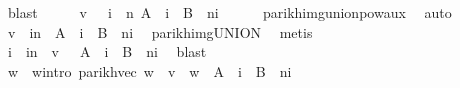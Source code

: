 \begin{isabellebody}
\ blast\isanewline
\ \ \isamarkupfalse%
\ \isamarkupfalse%
\ {\isachardoublequoteopen}v\ {\isasymin}\ {\isasymPsi}\ {\isacharparenleft}{\kern0pt}{\isasymUnion}i\ {\isasymle}\ n{\isachardot}{\kern0pt}\ A\ {\isacharcircum}{\kern0pt}{\isacharcircum}{\kern0pt}\ i\ {\isacharat}{\kern0pt}{\isacharat}{\kern0pt}\ B\ {\isacharcircum}{\kern0pt}{\isacharcircum}{\kern0pt}\ {\isacharparenleft}{\kern0pt}n{\isacharminus}{\kern0pt}i{\isacharparenright}{\kern0pt}{\isacharparenright}{\kern0pt}{\isachardoublequoteclose}\isanewline
\ \ \ \ \isamarkupfalse%
\ parikh{\isacharunderscore}{\kern0pt}img{\isacharunderscore}{\kern0pt}union{\isacharunderscore}{\kern0pt}pow{\isacharunderscore}{\kern0pt}aux{}\ \isamarkupfalse%
\ auto\isanewline
\ \ \isamarkupfalse%
\ \isamarkupfalse%
\ {\isachardoublequoteopen}v\ {\isasymin}\ {\isacharparenleft}{\kern0pt}{\isasymUnion}i{\isasymle}n{\isachardot}{\kern0pt}\ {\isasymPsi}\ {\isacharparenleft}{\kern0pt}A\ {\isacharcircum}{\kern0pt}{\isacharcircum}{\kern0pt}\ i\ {\isacharat}{\kern0pt}{\isacharat}{\kern0pt}\ B\ {\isacharcircum}{\kern0pt}{\isacharcircum}{\kern0pt}\ {\isacharparenleft}{\kern0pt}n{\isacharminus}{\kern0pt}i{\isacharparenright}{\kern0pt}{\isacharparenright}{\kern0pt}{\isacharparenright}{\kern0pt}{\isachardoublequoteclose}\ \isamarkupfalse%
\ parikh{\isacharunderscore}{\kern0pt}img{\isacharunderscore}{\kern0pt}UNION\ \isamarkupfalse%
\ metis\isanewline
\ \ \isamarkupfalse%
\ \isamarkupfalse%
\ i\ \ {\isachardoublequoteopen}i{\isasymle}n\ {\isasymand}\ v\ {\isasymin}\ {\isasymPsi}\ {\isacharparenleft}{\kern0pt}A\ {\isacharcircum}{\kern0pt}{\isacharcircum}{\kern0pt}\ i\ {\isacharat}{\kern0pt}{\isacharat}{\kern0pt}\ B\ {\isacharcircum}{\kern0pt}{\isacharcircum}{\kern0pt}\ {\isacharparenleft}{\kern0pt}n{\isacharminus}{\kern0pt}i{\isacharparenright}{\kern0pt}{\isacharparenright}{\kern0pt}{\isachardoublequoteclose}\ \isamarkupfalse%
\ blast\isanewline
\ \ \isamarkupfalse%
\ \isamarkupfalse%
\ w\ \ w{\isacharunderscore}{\kern0pt}intro{\isacharcolon}{\kern0pt}\ {\isachardoublequoteopen}parikh{\isacharunderscore}{\kern0pt}vec\ w\ {\isacharequal}{\kern0pt}\ v\ {\isasymand}\ w\ {\isasymin}\ A\ {\isacharcircum}{\kern0pt}{\isacharcircum}{\kern0pt}\ i\ {\isacharat}{\kern0pt}{\isacharat}{\kern0pt}\ B\ {\isacharcircum}{\kern0pt}{\isacharcircum}{\kern0pt}\ {\isacharparenleft}{\kern0pt}n{\isacharminus}{\kern0pt}i{\isacharparenright}{\kern0pt}{\isachardoublequoteclose}\isanewline

\end{isabellebody}
